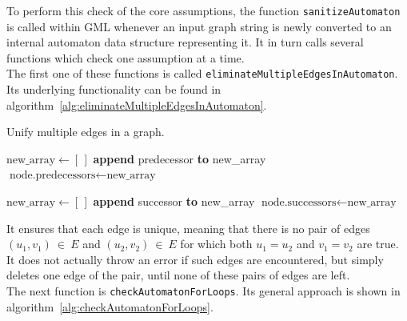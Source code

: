 \documentclass[a4paper,12pt,twoside,BCOR=10mm]{scrbook}
\begin{document}
To perform this check of the core assumptions, the function \texttt{sanitizeAutomaton} is called within GML
whenever an input graph string is newly converted to an internal automaton data structure representing it.
It in turn calls several functions which check one assumption at a time. \\
The first one of these functions is called \texttt{eliminateMultipleEdgesInAutomaton}.
Its underlying functionality can be found in algorithm~\ref{alg:eliminateMultipleEdgesInAutomaton}.
\begin{algorithm}
\caption[Unify multiple edges in a graph]{Unify multiple edges in a graph.}
\label{alg:eliminateMultipleEdgesInAutomaton}
\begin{algorithmic}[1]
		\State $ \textrm{new\_array} \gets [ \, ] $
				\State \textbf{append} predecessor \textbf{to} new\_array
			\EndIf
		\EndFor
		\State $ \textrm{node.predecessors} \gets \textrm{new\_array} $
	\EndIf

		\State $ \textrm{new\_array} \gets [ \, ] $
				\State \textbf{append} successor \textbf{to} new\_array
			\EndIf
		\EndFor
		\State $ \textrm{node.successors} \gets \textrm{new\_array} $
	\EndIf
\EndFor
\end{algorithmic}
\end{algorithm}
It ensures that each edge is unique, meaning that there is no pair of
edges $ (u_1, v_1) {\: \in \:} E $ and $ (u_2, v_2) {\: \in \:} E $ for which both $ u_1 = u_2 $ and $ v_1 = v_2 $ are true.
It does not actually throw an error if such edges are encountered, but simply deletes one edge of the pair, until none
of these pairs of edges are left. \\
The next function is \texttt{checkAutomatonForLoops}.
Its general approach is shown in algorithm~\ref{alg:checkAutomatonForLoops}.
\end{document}
